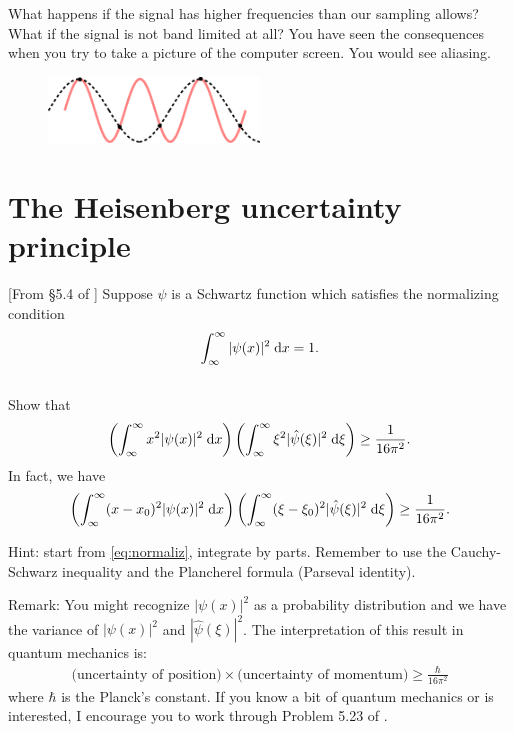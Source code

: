 \documentclass[11pt,letterpaper]{report}
\begin{document}
What happens if the signal has higher frequencies than our sampling allows? What if the signal is not band limited at all? You have seen the consequences when you try to take a picture of the computer screen. You would see aliasing.
\begin{figure}[H]
    \centering
    \includegraphics[width = 0.5\textwidth]{../Session_8/figs/alias}
\end{figure}

\section{The Heisenberg uncertainty principle}
[From \S5.4 of \cite{SteinShakarchi_03}] Suppose $\psi$ is a Schwartz function which satisfies the normalizing condition
\begin{align}
    \int_\infty^\infty |\psi(x)|^2 \;\mathrm{d} x = 1.\label{eq:normaliz}
\end{align}

\subsection{}
Show that
\begin{align}
    \left( \int_\infty^\infty x^2|\psi(x)|^2 \;\mathrm{d} x \right)\left( \int_\infty^\infty \xi^2|\hat\psi(\xi)|^2 \;\mathrm{d} \xi \right) \geq \frac{1}{16\pi^2}.
\end{align}
In fact, we have
\begin{align}
    \left( \int_\infty^\infty (x-x_0)^2|\psi(x)|^2 \;\mathrm{d} x \right)\left( \int_\infty^\infty (\xi-\xi_0)^2|\hat\psi(\xi)|^2 \;\mathrm{d} \xi \right) \geq \frac{1}{16\pi^2}.
\end{align}

Hint: start from \eqref{eq:normaliz}, integrate by parts. Remember to use the Cauchy-Schwarz inequality and the Plancherel formula (Parseval identity). 

Remark: You might recognize $|\psi(x)|^2$ as a probability distribution and we have the variance of $|\psi(x)|^2$ and $|\hat\psi(\xi)|^2$. The interpretation of this result in quantum mechanics is:
\begin{align}
    \text{(uncertainty of position)}\times\text{(uncertainty of momentum)} \geq \frac{\hbar}{16\pi^2}
\end{align}
where $\hbar$ is the Planck's constant. If you know a bit of quantum mechanics or is interested, I encourage you to work through Problem 5.23 of \cite{SteinShakarchi_03}. 
\end{document}
